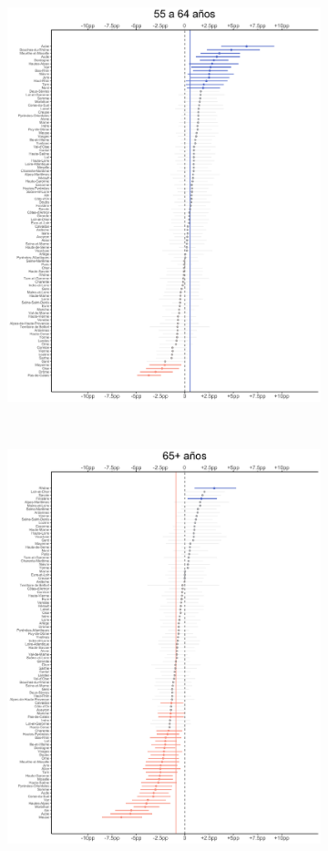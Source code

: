\begin{figure}
\begin{subfigure}{0.3\textwidth}
	\includegraphics[width = \textwidth]{Figs/Efectos/Efectos_Ed5_Modelo_H}
	\end{subfigure}
	~
	\begin{subfigure}{0.3\textwidth}
	\includegraphics[width = \textwidth]{Figs/Efectos/Efectos_Ed6_Modelo_H}

\end{subfigure}
\end{figure}
